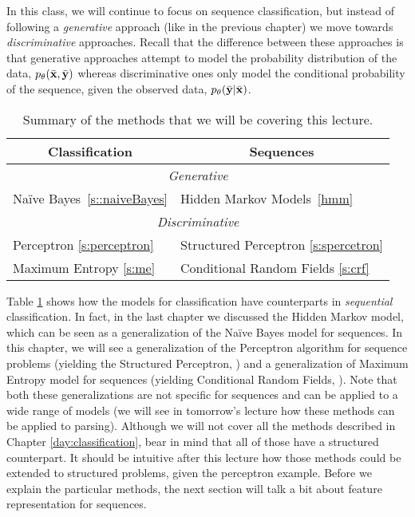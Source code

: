 In this class, we will continue to focus on sequence classification,
but instead of following a \emph{generative} approach (like in the previous
chapter) we move towards \emph{discriminative} approaches. Recall that the difference between these approaches is that generative approaches attempt to model the probability distribution of the data, $p_{\theta} (\bar{\mathbf{x}}, \bar{\mathbf{y}} )$ whereas discriminative ones only model the conditional probability of the sequence, given the observed data, $p_{\theta} (\bar{\mathbf{y}} | \bar{\mathbf{x}} )$.

\begin{table}
\centering
\begin{tabular}{|l|l|}
\hline

\multicolumn{1}{|c|}{\textbf{Classification}} & \multicolumn{1}{|c|}{\textbf{Sequences}} \\
\hline
\multicolumn{2}{|c|}{\emph{Generative}}\\
\hline
Na\"{i}ve Bayes~\ref{s::naiveBayes} & Hidden Markov Models~\ref{hmm} \\
\hline
\multicolumn{2}{|c|}{\emph{Discriminative}}\\
\hline
Perceptron \ref{s:perceptron} & Structured Perceptron \ref{s:spercetron}\\
\hline
Maximum Entropy \ref{s:me} & Conditional Random Fields \ref{s:crf}\\
\hline
\end{tabular}
\caption{\label{disc_seq_summary}Summary of the methods that we will be covering this lecture.}
\end{table}

Table \ref{disc_seq_summary} shows how the models for classification 
have counterparts in \emph{sequential} classification. In fact, in
the last chapter we discussed the Hidden Markov model, which can be seen as a
generalization of the Na\"{i}ve Bayes model for sequences. 
In this chapter, we will see a generalization of the
Perceptron algorithm for sequence problems (yielding the Structured
Perceptron, \citealt{collins2002discriminative}) and a generalization of
Maximum Entropy model for sequences (yielding Conditional Random Fields, \citealt{lafferty2001conditional}). 
Note that both these generalizations are  not specific for sequences
and can be applied to a wide range of models (we will see in tomorrow's
lecture how these methods can be applied to parsing).
Although we will not cover all the methods described in
Chapter \ref{day:classification}, bear in mind that all of those have a structured counterpart. 
It should be intuitive after this lecture how those methods could be
extended to structured problems, given the perceptron example.
Before we explain the particular methods, the next section will talk a
bit about feature representation for sequences. 

